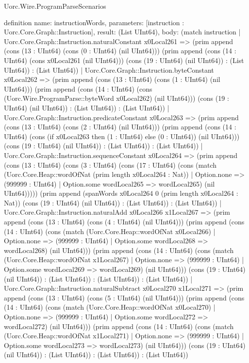 \begin{lexlean}{Uorc.Wire.ProgramParseScenarios}
\begin{semanticmodule}
definition{
  name: instructionWords,
  parameters: [instruction : Uorc.Core.Graph::Instruction],
  result: (List UInt64),
  body: (match instruction
    | Uorc.Core.Graph::Instruction.naturalConstant x0Local261 => (prim append (cons (13 : UInt64) (cons (0 : UInt64) (nil UInt64))) (prim append (cons (14 : UInt64) (cons x0Local261 (nil UInt64))) (cons (19 : UInt64) (nil UInt64)) : (List UInt64)) : (List UInt64))
    | Uorc.Core.Graph::Instruction.byteConstant x0Local262 => (prim append (cons (13 : UInt64) (cons (1 : UInt64) (nil UInt64))) (prim append (cons (14 : UInt64) (cons (Uorc.Wire.ProgramParse::byteWord x0Local262) (nil UInt64))) (cons (19 : UInt64) (nil UInt64)) : (List UInt64)) : (List UInt64))
    | Uorc.Core.Graph::Instruction.predicateConstant x0Local263 => (prim append (cons (13 : UInt64) (cons (2 : UInt64) (nil UInt64))) (prim append (cons (14 : UInt64) (cons (if x0Local263 then (1 : UInt64) else (0 : UInt64)) (nil UInt64))) (cons (19 : UInt64) (nil UInt64)) : (List UInt64)) : (List UInt64))
    | Uorc.Core.Graph::Instruction.sequenceConstant x0Local264 => (prim append (cons (13 : UInt64) (cons (3 : UInt64) (cons (17 : UInt64) (cons (match (Uorc.Core.Heap::wordOfNat (prim length x0Local264 : Nat))
      | Option.none => (999999 : UInt64)
      | Option.some wordLocal265 => wordLocal265) (nil UInt64))))) (prim append (spanWords x0Local264 0 (prim length x0Local264 : Nat)) (cons (19 : UInt64) (nil UInt64)) : (List UInt64)) : (List UInt64))
    | Uorc.Core.Graph::Instruction.naturalAdd x0Local266 x1Local267 => (prim append (cons (13 : UInt64) (cons (4 : UInt64) (nil UInt64))) (prim append (cons (14 : UInt64) (cons (match (Uorc.Core.Heap::wordOfNat x0Local266)
      | Option.none => (999999 : UInt64)
      | Option.some wordLocal268 => wordLocal268) (nil UInt64))) (prim append (cons (14 : UInt64) (cons (match (Uorc.Core.Heap::wordOfNat x1Local267)
      | Option.none => (999999 : UInt64)
      | Option.some wordLocal269 => wordLocal269) (nil UInt64))) (cons (19 : UInt64) (nil UInt64)) : (List UInt64)) : (List UInt64)) : (List UInt64))
    | Uorc.Core.Graph::Instruction.naturalSubtract x0Local270 x1Local271 => (prim append (cons (13 : UInt64) (cons (5 : UInt64) (nil UInt64))) (prim append (cons (14 : UInt64) (cons (match (Uorc.Core.Heap::wordOfNat x0Local270)
      | Option.none => (999999 : UInt64)
      | Option.some wordLocal272 => wordLocal272) (nil UInt64))) (prim append (cons (14 : UInt64) (cons (match (Uorc.Core.Heap::wordOfNat x1Local271)
      | Option.none => (999999 : UInt64)
      | Option.some wordLocal273 => wordLocal273) (nil UInt64))) (cons (19 : UInt64) (nil UInt64)) : (List UInt64)) : (List UInt64)) : (List UInt64))
}
\end{semanticmodule}
\end{lexlean}
